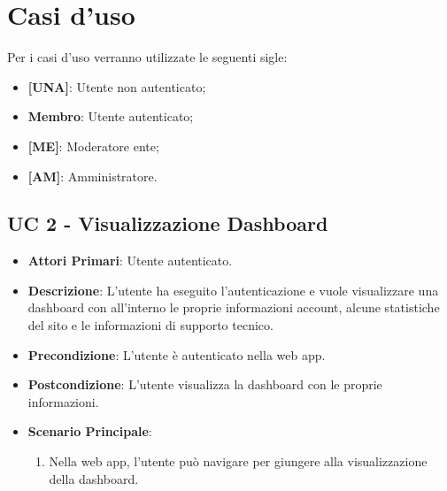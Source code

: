 \section{Casi d'uso}
	Per i casi d'uso verranno utilizzate le seguenti sigle:
	\begin{itemize}
		\item \textbf{[UNA]}: Utente non autenticato;
		\item \textbf{Membro}: Utente autenticato;
		\item \textbf{[ME]}: Moderatore ente;
		\item \textbf{[AM]}: Amministratore.
	\end{itemize}


		

		
		

		\subsection{UC 2 - Visualizzazione Dashboard}
		
		\begin{itemize}
			\item \textbf{Attori Primari}: Utente autenticato.
			\item \textbf{Descrizione}: L'utente ha eseguito l'autenticazione e vuole visualizzare una dashboard con all'interno le proprie informazioni account, alcune statistiche del sito e le informazioni di supporto tecnico.
			\item \textbf{Precondizione}: L'utente è autenticato nella web app.
			\item \textbf{Postcondizione}: L'utente visualizza la dashboard con le proprie informazioni.
			\item \textbf{Scenario Principale}:
			\begin{enumerate}
				\item Nella web app, l'utente può navigare per giungere alla visualizzazione della dashboard.
			\end{enumerate}	
		\end{itemize}


